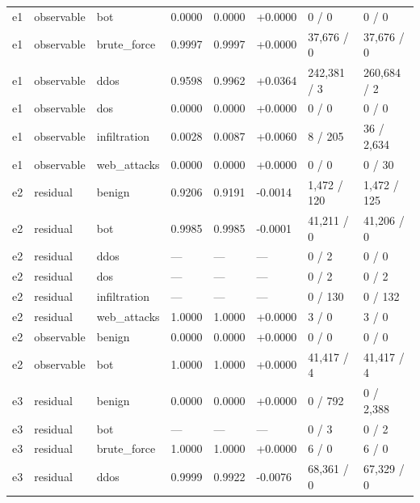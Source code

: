 \begin{landscape}
\begin{longtable}
{}e1 & observable & bot & 0.0000 & 0.0000 & +\allowbreak{}0.0000 & 0 /\allowbreak{} 0 & 0 /\allowbreak{} 0 \\
{}e1 & observable & brute\_\allowbreak{}force & 0.9997 & 0.9997 & +\allowbreak{}0.0000 & 37,676 /\allowbreak{} 0 & 37,676 /\allowbreak{} 0 \\
{}e1 & observable & ddos & 0.9598 & 0.9962 & +\allowbreak{}0.0364 & 242,381 /\allowbreak{} 3 & 260,684 /\allowbreak{} 2 \\
{}e1 & observable & dos & 0.0000 & 0.0000 & +\allowbreak{}0.0000 & 0 /\allowbreak{} 0 & 0 /\allowbreak{} 0 \\
{}e1 & observable & infiltration & 0.0028 & 0.0087 & +\allowbreak{}0.0060 & 8 /\allowbreak{} 205 & 36 /\allowbreak{} 2,634 \\
{}e1 & observable & web\_\allowbreak{}attacks & 0.0000 & 0.0000 & +\allowbreak{}0.0000 & 0 /\allowbreak{} 0 & 0 /\allowbreak{} 30 \\
{}e2 & residual & benign & 0.9206 & 0.9191 & -0.0014 & 1,472 /\allowbreak{} 120 & 1,472 /\allowbreak{} 125 \\
{}e2 & residual & bot & 0.9985 & 0.9985 & -0.0001 & 41,211 /\allowbreak{} 0 & 41,206 /\allowbreak{} 0 \\
{}e2 & residual & ddos & — & — & — & 0 /\allowbreak{} 2 & 0 /\allowbreak{} 0 \\
{}e2 & residual & dos & — & — & — & 0 /\allowbreak{} 2 & 0 /\allowbreak{} 2 \\
{}e2 & residual & infiltration & — & — & — & 0 /\allowbreak{} 130 & 0 /\allowbreak{} 132 \\
{}e2 & residual & web\_\allowbreak{}attacks & 1.0000 & 1.0000 & +\allowbreak{}0.0000 & 3 /\allowbreak{} 0 & 3 /\allowbreak{} 0 \\
{}e2 & observable & benign & 0.0000 & 0.0000 & +\allowbreak{}0.0000 & 0 /\allowbreak{} 0 & 0 /\allowbreak{} 0 \\
{}e2 & observable & bot & 1.0000 & 1.0000 & +\allowbreak{}0.0000 & 41,417 /\allowbreak{} 4 & 41,417 /\allowbreak{} 4 \\
{}e3 & residual & benign & 0.0000 & 0.0000 & +\allowbreak{}0.0000 & 0 /\allowbreak{} 792 & 0 /\allowbreak{} 2,388 \\
{}e3 & residual & bot & — & — & — & 0 /\allowbreak{} 3 & 0 /\allowbreak{} 2 \\
{}e3 & residual & brute\_\allowbreak{}force & 1.0000 & 1.0000 & +\allowbreak{}0.0000 & 6 /\allowbreak{} 0 & 6 /\allowbreak{} 0 \\
{}e3 & residual & ddos & 0.9999 & 0.9922 & -0.0076 & 68,361 /\allowbreak{} 0 & 67,329 /\allowbreak{} 0 \\

\end{longtable}
\end{landscape}
